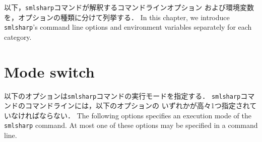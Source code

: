 \documentclass{jbook}
\newcommand{\txt}[2]{#2}
\begin{document}
\ifjp%
	以下，{\tt smlsharp}コマンドが解釈するコマンドラインオプション
および環境変数を，オプションの種類に分けて列挙する．
\else%
	In this chapter, we introduce {\tt smlsharp}'s command line
options and environment variables separately for each category.
\fi%

\section{\txt{モード選択オプション}{Mode switch}}

\ifjp%
	以下のオプションは{\tt smlsharp}コマンドの実行モードを指定する．
	{\tt smlsharp}コマンドのコマンドラインには，以下のオプションの
いずれかが高々1つ指定されていなければならない．
\else%
	The following options specifies an execution mode of the
{\tt smlsharp} command.
	At most one of these options may be specified in a command line.
\fi%
\end{document}

